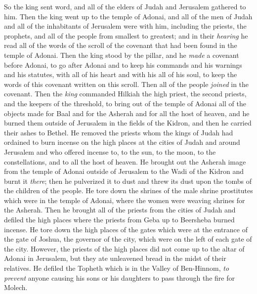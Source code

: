 \begin{biblechapter} %
 So the king sent word, and all of the elders of Judah and Jerusalem gathered to him.
\verse Then the king went up to the temple of Adonai, and all of the men of Judah and all of the inhabitants of Jerusalem were with him, including the priests, the prophets, and all of the people from smallest to greatest; and in their \textit{hearing} he read all of the words of the scroll of the covenant that had been found in the temple of Adonai.
\verse Then the king stood by the pillar, and he \textit{made} a covenant before Adonai, to go after Adonai and to keep his commands and his warnings and his statutes, with all of his heart and with his all of his soul, to keep the words of this covenant written on this scroll. Then all of the people \textit{joined} in the covenant.
\verse Then the \textit{king} commanded Hilkiah the high priest, the second priests, and the keepers of the threshold, to bring out of the temple of Adonai all of the objects made for Baal and for the Asherah and for all the host of heaven, and he burned them outside of Jerusalem in the fields of the Kidron, and then he carried their ashes to Bethel.
\verse He removed the priests whom the kings of Judah had ordained to burn incense on the high places at the cities of Judah and around Jerusalem and who offered incense to, to the sun, to the moon, to the constellations, and to all the host of heaven.
\verse He brought out the Asherah image from the temple of Adonai outside of Jerusalem to the Wadi of the Kidron and burnt it \textit{there}; then he pulverized it to dust and threw its dust upon the tombs of the children of the people.
\verse He tore down the shrines of the male shrine prostitutes which were in the temple of Adonai, where the women were weaving shrines for the Asherah.
\verse Then he brought all of the priests from the cities of Judah and defiled the high places where the priests from Geba up to Beersheba burned incense. He tore down the high places of the gates which were at the entrance of the gate of Joshua, the governor of the city, which were on the left of each gate of the city.
\verse However, the priests of the high places did not come up to the altar of Adonai in Jerusalem, but they ate unleavened bread in the midst of their relatives.
\verse He defiled the Topheth which is in the Valley of Ben-Hinnom, \textit{to prevent} anyone causing his sons or his daughters to pass through the fire for Molech.

\end{biblechapter}

